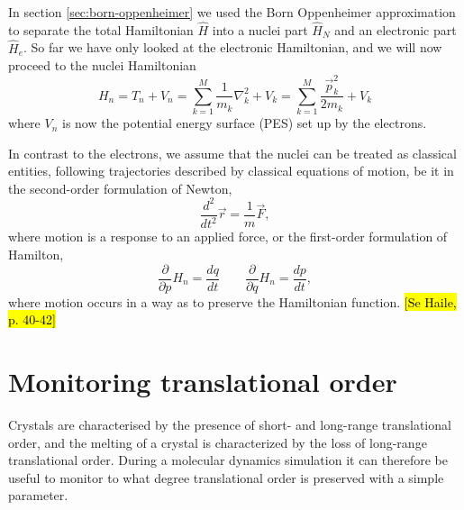 \documentclass[11pt,bibliography=totoc,index=totoc]{scrbook}   %
\newcommand{\comment}[1]{\hl{#1}}
\begin{document}
In section \ref{sec:born-oppenheimer} we used the Born Oppenheimer approximation to separate the total Hamiltonian $\hat{H}$ into a nuclei part $\hat{H}_N$ and an electronic part $\hat{H}_e$. 
So far we have only looked at the electronic Hamiltonian, and we will now proceed to the nuclei Hamiltonian
\begin{equation}
  H_n = T_n + V_n = \sum_{k=1}^M \frac{1}{m_k}\nabla_k^2 + V_k = \sum_{k=1}^M \frac{\vec{p}_k^2}{2m_k} + V_k
  \label{eq:nucleiHamiltonian}
\end{equation}
where $V_n$ is now the potential energy surface (PES) set up by the electrons.

In contrast to the electrons, we assume that the nuclei can be treated as classical entities, following trajectories described by 
classical equations of motion, be it in the
second-order formulation of Newton,
\begin{equation}
  \frac{d^2}{d t^2} \vec{r} = \frac{1}{m}\vec{F},
\end{equation}
where motion is a response to an applied force,
or the first-order formulation of Hamilton,
\begin{equation}
  \frac{\partial}{\partial p} H_n = \frac{dq}{dt} \qquad
  \frac{\partial}{\partial q} H_n = \frac{dp}{dt},
\end{equation}
where motion occurs in a way as to preserve the Hamiltonian function.
\comment{[Se Haile, p. 40-42]}

%
\section{Monitoring translational order}\label{sec:translational-order}
%


Crystals are characterised by the presence of short- and long-range translational order,
and the melting of a crystal is characterized by the loss of long-range translational order.
During a molecular dynamics simulation it can therefore be useful to monitor to what degree translational order is preserved with a simple parameter.
\end{document}
